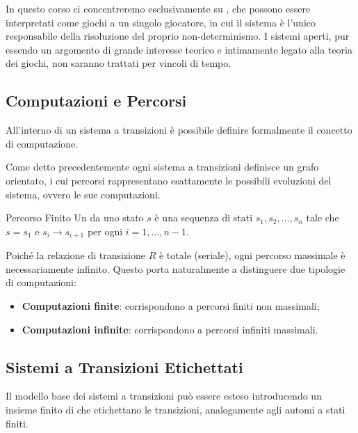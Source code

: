 \begin{note}{}
  In questo corso ci concentreremo esclusivamente su , che possono essere interpretati come giochi a un singolo giocatore, in cui il sistema è l'unico responsabile della risoluzione del proprio non-determinismo. I sistemi aperti, pur essendo un argomento di grande interesse teorico e intimamente legato alla teoria dei giochi, non saranno trattati per vincoli di tempo.
\end{note}

\subsection{Computazioni e Percorsi}

All'interno di un sistema a transizioni è possibile definire formalmente il concetto di computazione.

Come detto precedentemente ogni sistema a transizioni definisce un grafo orientato, i cui percorsi rappresentano esattamente le possibili evoluzioni del sistema, ovvero le sue computazioni.

\begin{definition}{Percorso Finito}
  Un  da uno stato \(s\) è una sequenza di stati \(s_1, s_2, \ldots, s_n\) tale che \(s = s_1\) e \(s_i \xrightarrow{} s_{i+1}\) per ogni \(i = 1, \ldots, n-1\).
\end{definition}

Poiché la relazione di transizione \(R\) è totale (seriale), ogni percorso massimale è necessariamente infinito. Questo porta naturalmente a distinguere due tipologie di computazioni:
\begin{itemize}
  \item \textbf{Computazioni finite}: corrispondono a percorsi finiti non massimali;
  \item \textbf{Computazioni infinite}: corrispondono a percorsi infiniti massimali.
\end{itemize}

\subsection{Sistemi a Transizioni Etichettati}

Il modello base dei sistemi a transizioni può essere esteso introducendo un insieme finito di  che etichettano le transizioni, analogamente agli automi a stati finiti.

